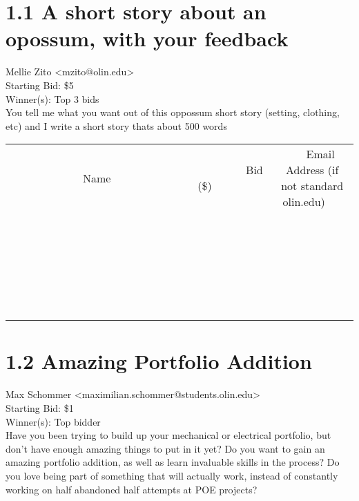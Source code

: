 \documentclass[11pt]{article}
\begin{document}
		
					\section*{1.1 A short story about an opossum, with your feedback}
					Mellie Zito <mzito@olin.edu> \\
					Starting Bid: \$5 \\
					Winner(s): Top 3 bids \\
					You tell me what you want out of this oppossum short story (setting, clothing, etc) and I write a short story thats about 500 words \\
					[6ex]
					\begin{tabular}{c c c}
						~~~~~~~~~~~~~Name~~~~~~~~~~~~~ & ~~~~~~~~~Bid (\$)~~~~~~~~~ & ~~~Email Address (if not standard olin.edu)~~~ \\
				
 & & \\
\hline
 & & \\
\hline
 & & \\
\hline
 & & \\
\hline
 & & \\
\hline
 & & \\
\hline
 & & \\
\hline
 & & \\
\hline
 & & \\
\hline
 & & \\
\hline
 & & \\
\hline
 & & \\
\hline
 & & \\
\hline
 & & \\
\hline
 & & \\
\hline
 & & \\
\hline
 & & \\
\hline
 & & \\
\hline
 & & \\
\hline
 & & \\
\hline
 & & \\
\hline
 & & \\
\hline
 & & \\
\hline
 & & \\
\hline
 & & \\
\hline
 & & \\
\hline
					\end{tabular}
					\clearpage
				
					\section*{1.2 Amazing Portfolio Addition}
					Max Schommer <maximilian.schommer@students.olin.edu> \\
					Starting Bid: \$1 \\
					Winner(s): Top bidder \\
					Have you been trying to build up your mechanical or electrical portfolio, but don't have enough amazing things to put in it yet? Do you want to gain an amazing portfolio addition, as well as learn invaluable skills in the process? Do you love being part of something that will actually work, instead of constantly working on half abandoned half attempts at POE projects? 
\end{document}
